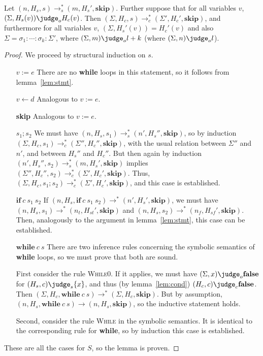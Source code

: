 \begin{lemma} \label{lem:whil}
    Let $(n, H_s, s) \to_s^{*} (m, H_s', \mathbf{skip})$.
  Further suppose that for all variables $v$,
  $(\Sigma, H_s(v)) \judge_o H_c(v)$.
  Then $(\Sigma, H_c, s) \to_c^{*} (\Sigma', H_c', \mathbf{skip})$,
  and furthermore for all variables $v$,
  $(\Sigma, H_s'(v)) = H_c'(v)$ and also
  $\Sigma = \sigma_1:\dotsb:\sigma_k:\Sigma'$,
  where $(\Sigma, m) \judge_o l + k$
  (where $(\Sigma, n) \judge_o l$).
\end{lemma}

\begin{proof}
  We proceed by structural induction on $s$.

  \begin{itemize}
  \item[$v := e$] There are no \textbf{while} loops in this statement,
    so it follows from lemma~\ref{lem:stmt}.
  \item[$v \leftarrow d$] Analogous to $v := e$.
  \item[\textbf{skip}] Analogous to $v := e$.
  \item[$s_1 ; s_2$] 
    We must have
    $(n, H_s, s_1) \to_s^{*} (n', H_s'', \mathbf{skip})$,
    so by induction
    $(\Sigma, H_c, s_1) \to_c^{*} (\Sigma'', H_c'', \mathbf{skip})$,
    with the usual relation between $\Sigma''$ and $n'$, and between
    $H_s''$ and $H_c''$.
    But then again by induction
    $(n', H_s'', s_2) \to_s^{*} (m, H_s', \mathbf{skip})$
    implies
    $(\Sigma'', H_c'', s_2) \to_c^{*} (\Sigma', H_c', \mathbf{skip})$.
    Thus,
    $(\Sigma, H_c, s_1;s_2) \to_c^{*} (\Sigma', H_c', \mathbf{skip})$,
    and this case is established.
  \item[$\mathbf{if}\:c\:s_1\:s_2$]
      If $(n, H_s, \mathbf{if}\:c\:s_1\:s_2) \to^{*} (n', H_s', \mathbf{skip})$,
      we must have $(n, H_s, s_1) \to^{*} (n_t, H_{st}', \mathbf{skip})$
      and $(n, H_s, s_2) \to^{*} (n_f, H_{sf}', \mathbf{skip})$.  Then,
    analogously to the argument in lemma~\ref{lem:stmt}, this case can
    be established.
  \item[$\mathbf{while}\:c\:s$]
    There are two inference rules concerning the symbolic semantics of
    \textbf{while} loops, so we must prove that both are sound.

    First consider the rule \textsc{While0}. If it applies, we must
    have $(\Sigma, x) \judge_o \mathbf{false}$
    for $(H_s, c) \judge_s \{ x \}$,
    and thus (by lemma~\ref{lem:cond})
    $(H_c, c) \judge_c \mathbf{false}$.
    Then
    $(\Sigma, H_c, \mathbf{while}\:c\:s) \to^{*} (\Sigma, H_c, \mathbf{skip})$.
    But by assumption,
    $(n, H_s, \mathbf{while}\:c\:s) \to (n, H_s, \mathbf{skip})$,
    so the inductive statement holds.

    Second, consider the rule \textsc{While} in the symbolic
    semantics.  It is identical to the corresponding rule for
    \textbf{while}, so by induction this case is established.
  \end{itemize}

  These are all the cases for $S$, so the lemma is proven.
  
\end{proof}

